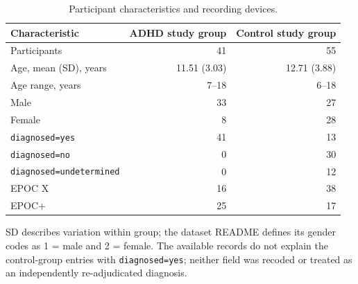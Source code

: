 \begin{table}[!htbp]
\centering\small
\caption{Participant characteristics and recording devices.}
\label{tab:participants}
\setlength{\tabcolsep}{5pt}\renewcommand{\arraystretch}{1.14}
\begin{tabularx}{\textwidth}{@{}>{\raggedright\arraybackslash}Xrr@{}}
\toprule
Characteristic & ADHD study group & Control study group\\\midrule
Participants & 41 & 55\\
Age, mean (SD), years & 11.51 (3.03) & 12.71 (3.88)\\
Age range, years & 7--18 & 6--18\\
Male & 33 & 27\\
Female & 8 & 28\\
\texttt{diagnosed=yes} & 41 & 13\\
\texttt{diagnosed=no} & 0 & 30\\
\texttt{diagnosed=undetermined} & 0 & 12\\
\midrule
EPOC X & 16 & 38\\
EPOC+ & 25 & 17\\
\bottomrule\end{tabularx}
\par\smallskip\begin{minipage}{\textwidth}\footnotesize SD describes variation within group; the dataset README defines its gender codes as 1 = male and 2 = female. The available records do not explain the control-group entries with \texttt{diagnosed=yes}; neither field was recoded or treated as an independently re-adjudicated diagnosis.\end{minipage}
\end{table}


